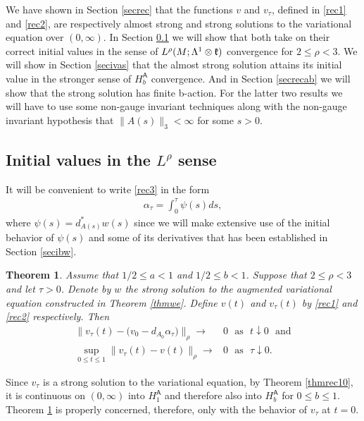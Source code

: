 \documentclass[12pt]{article}
\newtheorem{theorem}{Theorem}[section]
\def \L{\Lambda}
\def \({\Big(}
\def \){\Big)}
\def \As{\mathsf{A}}
\def \kf{\frak k}
\def \eref{\eqref}
\numberwithin{equation}{section}
\begin{document}
 
 We have shown in Section  \ref{secrec}  that the functions $v$ and $v_\tau$,
defined in \eref{rec1} and \eref{rec2}, are respectively almost strong
and strong solutions to the variational equation over $(0, \infty)$. In Section \ref{secinit} 
we will show  that both take on their correct initial values in the sense
 of $L^\rho(M; \L^1\otimes \kf)$ convergence for $2\le \rho <3$. We will show in Section \ref{secivas} that 
 the almost strong solution attains its initial value in the stronger
  sense of $H_b^\As$ convergence.     And in Section
 \ref{secrecab} we will show that the strong solution has finite b-action. For the latter two results we
 will have to use some non-gauge invariant techniques along with the non-gauge invariant 
 hypothesis that $\| A(s)\|_3 < \infty$ for some $s >0$. 
 



\subsection{Initial values in the $L^\rho$ sense}   \label{secinit}



It will be convenient to write \eref{rec3} in the form
 \begin{align}
 \alpha_\tau = \int_0^\tau \psi(s) ds, \label{rec3b}
 \end{align}
 where $\psi(s) = d_{A(s)}^*w(s)$ since we will make extensive use of the initial behavior 
  of $\psi(s)$ and some of its derivatives that has been established in Section \ref{secibw}.

       \begin{theorem} \label{strinit} Assume that $1/2 \le a < 1$ and $1/2 \le b < 1$. 
Suppose that $ 2 \le \rho < 3$ and let $ \tau >0$. %
 Denote by $w$ the strong solution to the augmented variational equation constructed
  in Theorem \ref{thmwe}. Define $v(t)$ and $v_\tau(t)$ by \eref{rec1} and \eref{rec2} respectively. Then 
\begin{align}
\| v_\tau(t) - \(v_0 - d_{A_0} \alpha_\tau\)\|_\rho \rightarrow  &0
                                     \ \ \ \text{as}\ \ \ t \downarrow 0 \ \ \ \text{and} \label{rec976} \\
 \sup_{0\le t \le 1} \| v_\tau(t) - v(t)\|_\rho \rightarrow &0 \ \ \ \text{as}\ \ \ \tau  \downarrow 0. \label{rec977}
\end{align}
\end{theorem}

 
Since $v_\tau$ is a strong solution to the variational equation, by Theorem \ref{thmrec10}, 
it is continuous on $(0, \infty)$ into $H_1^\As$ and therefore also into $H_b^\As$ for $0 \le b \le 1$. 
Theorem \ref{strinit} is properly concerned, therefore, only with the behavior of $v_\tau$ at $t =0$.
\end{document}
